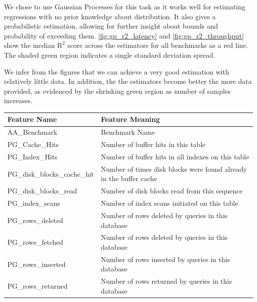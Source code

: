 We chose to use Gaussian Processes for this task as it works well for
estimating regressions with no prior knowledge about distribution. It
also gives a probabilistic estimation, allowing for further insight
about bounds and probability of exceeding
them. \cref{fig:gp_r2_latency} and \cref{fig:gp_r2_throughput} show
the median $\textrm{R}^2$ score across the estimators for all
benchmarks as a red line. The shaded green region indicates a single
standard deviation spread.

We infer from the figures that we can achieve a very good estimation
with relatively little data. In addition, the the estimators become
better the more data provided, as evidenced by the shrinking green
region as number of samples increases.

\begin{table}
  \centering
  \small{
    \centering
    \begin{tabular}{ll}
      \toprule
      Feature Name                   & Feature Meaning                                                     \\
      \midrule
      AA\_Benchmark                  & Benchmark Name                                                      \\
      PG\_Cache\_Hits                & Number of buffer hits in this table                                 \\
      PG\_Index\_Hits                & Number of buffer hits in all indexes on this table                  \\
      PG\_disk\_blocks\_cache\_hit   & Number of times disk blocks were found already in the buffer cache  \\
      PG\_disk\_blocks\_read         & Number of disk blocks read from this sequence                       \\
      PG\_index\_scans               & Number of index scans initiated on this table                       \\
      PG\_rows\_deleted              & Number of rows deleted by queries in this database                  \\
      PG\_rows\_fetched              & Number of rows deleted by queries in this database                  \\
      PG\_rows\_inserted             & Number of rows inserted by queries in this database                 \\
      PG\_rows\_returned             & Number of rows returned by queries in this database                 \\

\end{tabular}}
\end{table}
